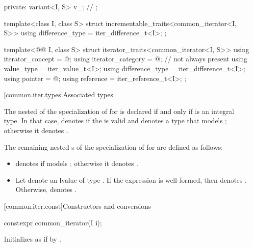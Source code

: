 \begin{codeblock}
{{  private:
    variant<I, S> v_;   // \expos
  };

  template<class I, class S>
  struct incrementable_traits<common_iterator<I, S>> {
    using difference_type = iter_difference_t<I>;
  };

  template<@@ I, class S>
  struct iterator_traits<common_iterator<I, S>> {
    using iterator_concept = @\seebelow@;
    using iterator_category = @\seebelow@;  // not always present
    using value_type = iter_value_t<I>;
    using difference_type = iter_difference_t<I>;
    using pointer = @\seebelow@;
    using reference = iter_reference_t<I>;
  };
}
\end{codeblock}

[common.iter.types]{Associated types}

\pnum
The nested   of
the specialization of  for 
is declared if and only if  is an integral type.
In that case,
 denotes  if
the  
is valid and denotes a type that
models ;
otherwise it denotes .

\pnum
The remaining nested s of the specialization of
 for  are defined as follows:
\begin{itemize}
\item
{} denotes 
if  models ;
otherwise it denotes .

\item
Let  denote an lvalue of type .
If the expression  is well-formed,
then  denotes .
Otherwise,  denotes .
\end{itemize}

[common.iter.const]{Constructors and conversions}

%
\begin{itemdecl}
constexpr common_iterator(I i);
\end{itemdecl}

\begin{itemdescr}
\pnum
\effects
Initializes  as if by .
\end{itemdescr}

